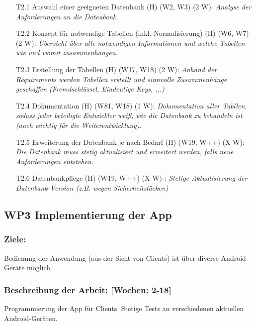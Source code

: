 \documentclass{scrreprt}
\begin{document}
\begin{enumerate}
\item [T2.1] Auswahl einer geeigneten Datenbank (H) (W2, W3) (2 W): \emph{ Analyse der Anforderungen an die Datenbank.}
\item [T2.2] Konzept für notwendige Tabellen (inkl. Normalisierung) (H) (W6, W7) (2 W): \emph{ Übersicht über alle notwendigen Informationen und welche Tabellen wie und womit zusammenhängen.}
\item [T2.3] Erstellung der Tabellen (H) (W17, W18) (2 W): \emph{ Anhand der Requirements werden Tabellen erstellt und sinnvolle Zusammenhänge geschaffen (Fremdschlüssel, Eindeutige Keys, ...)}
\item [T2.4] Dokumentation (H) (W81, W18) (1 W): \emph{ Dokumentation aller Tabllen, sodass jeder beteiligte Entwickler weiß, wie die Datenbank zu behandeln ist (auch wichtig für die Weiterentwicklung).}
\item [T2.5] Erweiterung der Datenbank je nach Bedarf (H) (W19, W++) (X W): \emph{ Die Datenbank muss stetig aktualisiert und erweitert werden, falls neue Anforderungen entstehen.}
\item [T2.6] Datenbankpflege (H) (W19, W++) (X W) : \emph{ Stetige Aktualisierung der Datenbank-Version (z.B. wegen Sicherheitslücken)}
\end{enumerate}

\subsection*{WP3 Implementierung der App}

\subsubsection{Ziele:} Bedienung der Anwendung (aus der Sicht von Clients) ist über diverse Android-Geräte möglich.
\subsubsection{Beschreibung der Arbeit: [Wochen: 2-18]} Programmierung der App für Clients. Stetige Tests an verschiedenen aktuellen Android-Geräten.
\end{document}
